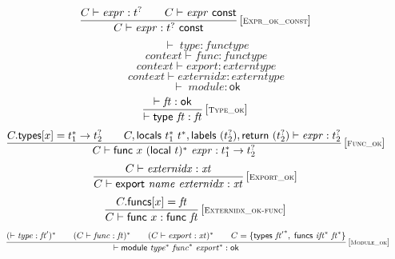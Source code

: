 \documentclass{article}
\begin{document}
$$
\begin{array}{@{}c@{}}\displaystyle
\frac{
C \vdash {\mathit{expr}} : {t^?}
 \qquad
C \vdash {\mathit{expr}}~\mathsf{const}
}{
C \vdash {\mathit{expr}} : {t^?}~\mathsf{const}
} \, {[\textsc{\scriptsize Expr\_ok\_const}]}
\qquad
\end{array}
$$
$$
\boxed{{ \vdash }\;{\mathit{type}} : {\mathit{functype}}}
$$
$$
\boxed{{\mathit{context}} \vdash {\mathit{func}} : {\mathit{functype}}}
$$
$$
\boxed{{\mathit{context}} \vdash {\mathit{export}} : {\mathit{externtype}}}
$$
$$
\boxed{{\mathit{context}} \vdash {\mathit{externidx}} : {\mathit{externtype}}}
$$
$$
\boxed{{ \vdash }\;{\mathit{module}} : \mathsf{ok}}
$$
$$
\begin{array}{@{}c@{}}\displaystyle
\frac{
{ \vdash }\;{\mathit{ft}} : \mathsf{ok}
}{
{ \vdash }\;\mathsf{type}~{\mathit{ft}} : {\mathit{ft}}
} \, {[\textsc{\scriptsize Type\_ok}]}
\qquad
\end{array}
$$
$$
\begin{array}{@{}c@{}}\displaystyle
\frac{
C{.}\mathsf{types}{}[x] = {t_1^\ast} \rightarrow {t_2^?}
 \qquad
C, \mathsf{locals}~{t_1^\ast}~{t^\ast}, \mathsf{labels}~({t_2^?}), \mathsf{return}~({t_2^?}) \vdash {\mathit{expr}} : {t_2^?}
}{
C \vdash \mathsf{func}~x~{(\mathsf{local}~t)^\ast}~{\mathit{expr}} : {t_1^\ast} \rightarrow {t_2^?}
} \, {[\textsc{\scriptsize Func\_ok}]}
\qquad
\end{array}
$$
$$
\begin{array}{@{}c@{}}\displaystyle
\frac{
C \vdash {\mathit{externidx}} : {\mathit{xt}}
}{
C \vdash \mathsf{export}~{\mathit{name}}~{\mathit{externidx}} : {\mathit{xt}}
} \, {[\textsc{\scriptsize Export\_ok}]}
\qquad
\end{array}
$$
$$
\begin{array}{@{}c@{}}\displaystyle
\frac{
C{.}\mathsf{funcs}{}[x] = {\mathit{ft}}
}{
C \vdash \mathsf{func}~x : \mathsf{func}~{\mathit{ft}}
} \, {[\textsc{\scriptsize Externidx\_ok{-}func}]}
\qquad
\end{array}
$$
$$
\begin{array}{@{}c@{}}\displaystyle
\frac{
({ \vdash }\;{\mathit{type}} : {\mathit{ft}'})^\ast
 \qquad
(C \vdash {\mathit{func}} : {\mathit{ft}})^\ast
 \qquad
(C \vdash {\mathit{export}} : {\mathit{xt}})^\ast
 \qquad
C = \{ \begin{array}[t]{@{}l@{}}
\mathsf{types}~{{\mathit{ft}'}^\ast},\; \mathsf{funcs}~{{\mathit{ift}}^\ast}~{{\mathit{ft}}^\ast} \}\end{array}
}{
{ \vdash }\;\mathsf{module}~{{\mathit{type}}^\ast}~{{\mathit{func}}^\ast}~{{\mathit{export}}^\ast} : \mathsf{ok}
} \, {[\textsc{\scriptsize Module\_ok}]}
\qquad
\end{array}
$$
\end{document}
